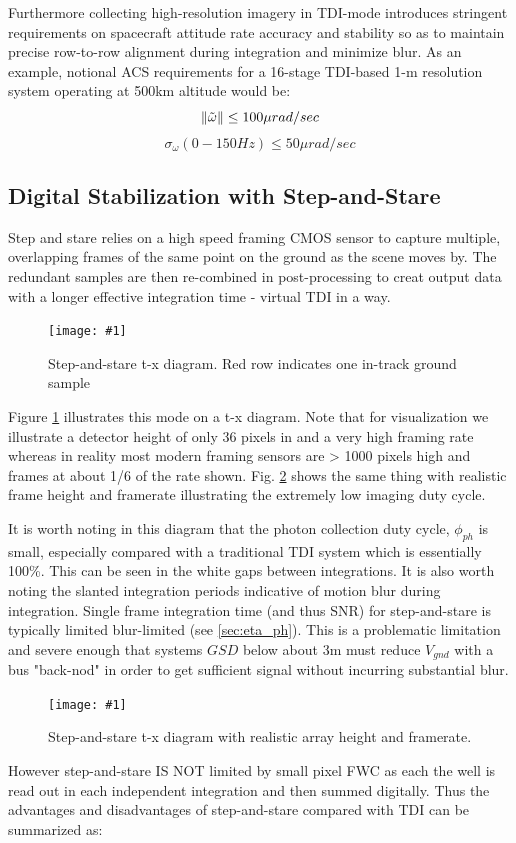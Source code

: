 \documentclass[10pt,journal]{IEEEtran}  %
\newcommand{\includefigure}[3]
{
  \begin{figure}[h!]
  \centering
  \texttt{[image: \#1]}
  \caption[]{#3}
  \label{#2}
  \end{figure}
}
\DeclarePairedDelimiter{\norm}{\lVert}{\rVert}
\begin{document}
{Furthermore collecting high-resolution imagery in TDI-mode introduces stringent requirements on spacecraft attitude rate accuracy and stability so as to maintain precise row-to-row alignment during integration and minimize blur. As an example, notional ACS requirements for a 16-stage TDI-based 1-m resolution system operating at 500km altitude would be\cite{pittelkau}:
$$\norm{\tilde{\omega}} \leq 100 \mu rad / sec$$
$$\sigma_{\omega}(0-150Hz) \leq 50 \mu rad/sec$$

\subsection{Digital Stabilization with Step-and-Stare}
Step and stare relies on a high speed framing CMOS sensor to capture multiple, overlapping frames of the same point on the ground as the scene moves by.  The redundant samples are then re-combined in post-processing to creat output data with a longer effective integration time - virtual TDI in a way.

\includefigure{figures/step_stare.pgf}{fig:step_stare}{Step-and-stare t-x diagram.  Red row indicates one in-track ground sample}

Figure \ref{fig:step_stare} illustrates this mode on a t-x diagram.  Note that for visualization we illustrate a detector height of only 36 pixels in and a very high framing rate whereas in reality most modern framing sensors are > 1000 pixels high and frames at about 1/6 of the rate shown.  Fig. \ref{fig:step_stare_real} shows the same thing with realistic frame height and framerate illustrating the extremely low imaging duty cycle.

It is worth noting in this diagram that the photon collection duty cycle, $\phi_{ph}$ is small, especially compared with a traditional TDI system which is essentially 100\%.  This can be seen in the white gaps between integrations.  It is also worth noting the slanted integration periods indicative of motion blur during integration.  Single frame integration time (and thus SNR) for step-and-stare is typically limited blur-limited (see \ref{sec:eta_ph}).  This is a problematic limitation and severe enough that systems $GSD$ below about 3m must reduce $V_{gnd}$ with a bus "back-nod" in order to get sufficient signal without incurring substantial blur.

\includefigure{figures/step_stare_real.pgf}{fig:step_stare_real}{Step-and-stare t-x diagram with realistic array height and framerate.}

However step-and-stare IS NOT limited by small pixel FWC as each the well is read out in each independent integration and then summed digitally.  Thus the advantages and disadvantages of step-and-stare compared with TDI can be summarized as:


}
\end{document}
